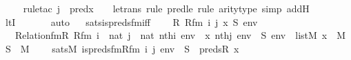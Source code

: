 \begin{isabellebody}
\ \ \ \ \isamarkupfalse%
{\isacharparenleft}{\kern0pt}rule{\isacharunderscore}{\kern0pt}tac\ j\ {\isacharequal}{\kern0pt}\ {\isachardoublequoteopen}pred{\isacharparenleft}{\kern0pt}x\ {\isacharhash}{\kern0pt}{\isacharplus}{\kern0pt}\ {}{\isacharparenright}{\kern0pt}{\isachardoublequoteclose}\ \ le{\isacharunderscore}{\kern0pt}trans{\isacharcomma}{\kern0pt}\ rule\ pred{\isacharunderscore}{\kern0pt}le{\isacharcomma}{\kern0pt}\ rule\ arity{\isacharunderscore}{\kern0pt}type{\isacharcomma}{\kern0pt}\ simp\ add{\isacharcolon}{\kern0pt}H{\isacharparenright}{\kern0pt}\isanewline
\ \ \ \ \isamarkupfalse%
\ ltI\ \isanewline
\ \ \ \ \isamarkupfalse%
\ auto\isanewline
{}\isamarkupfalse%
%
\endisatagproof
{\isafoldproof}%
%
\isadelimproof
\ \isanewline
%
\endisadelimproof
\isanewline
{}\isamarkupfalse%
\ sats{\isacharunderscore}{\kern0pt}is{\isacharunderscore}{\kern0pt}preds{\isacharunderscore}{\kern0pt}fm{\isacharunderscore}{\kern0pt}iff\ {\isacharcolon}{\kern0pt}\isanewline
\ \ \ R\ Rfm\ i\ j\ x\ S\ env\isanewline
\ \ \ {\isachardoublequoteopen}Relation{\isacharunderscore}{\kern0pt}fm{\isacharparenleft}{\kern0pt}R{\isacharcomma}{\kern0pt}\ Rfm{\isacharparenright}{\kern0pt}{\isachardoublequoteclose}\ {\isachardoublequoteopen}i\ {\isasymin}\ nat{\isachardoublequoteclose}\ {\isachardoublequoteopen}j\ {\isasymin}\ nat{\isachardoublequoteclose}\ {\isachardoublequoteopen}nth{\isacharparenleft}{\kern0pt}i{\isacharcomma}{\kern0pt}\ env{\isacharparenright}{\kern0pt}\ {\isacharequal}{\kern0pt}\ x{\isachardoublequoteclose}\ {\isachardoublequoteopen}nth{\isacharparenleft}{\kern0pt}j{\isacharcomma}{\kern0pt}\ env{\isacharparenright}{\kern0pt}\ {\isacharequal}{\kern0pt}\ S{\isachardoublequoteclose}\ {\isachardoublequoteopen}env\ {\isasymin}\ list{\isacharparenleft}{\kern0pt}M{\isacharparenright}{\kern0pt}{\isachardoublequoteclose}\ {\isachardoublequoteopen}x\ {\isasymin}\ M{\isachardoublequoteclose}\ {\isachardoublequoteopen}S\ {\isasymin}\ M{\isachardoublequoteclose}\ \isanewline
\ \ \ {\isachardoublequoteopen}sats{\isacharparenleft}{\kern0pt}M{\isacharcomma}{\kern0pt}\ is{\isacharunderscore}{\kern0pt}preds{\isacharunderscore}{\kern0pt}fm{\isacharparenleft}{\kern0pt}Rfm{\isacharcomma}{\kern0pt}\ i{\isacharcomma}{\kern0pt}\ j{\isacharparenright}{\kern0pt}{\isacharcomma}{\kern0pt}\ env{\isacharparenright}{\kern0pt}\ {\isasymlongleftrightarrow}\ S\ {\isacharequal}{\kern0pt}\ preds{\isacharparenleft}{\kern0pt}R{\isacharcomma}{\kern0pt}\ x{\isacharparenright}{\kern0pt}{\isachardoublequoteclose}\isanewline

\end{isabellebody}
